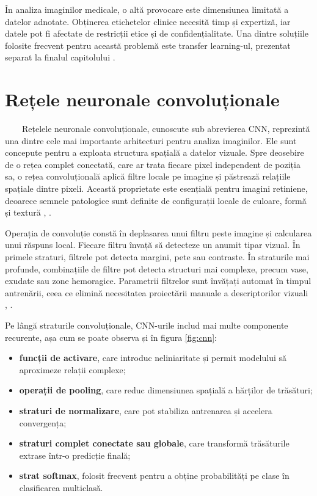 \documentclass[12pt, a4paper, twoside, romanian]{teza-upb}
\begin{document}
În analiza imaginilor medicale, o altă provocare este dimensiunea limitată a datelor
adnotate. Obținerea etichetelor clinice necesită timp și expertiză, iar datele pot fi
afectate de restricții etice și de confidențialitate. Una dintre soluțiile folosite frecvent
pentru această problemă este transfer learning-ul, prezentat separat la finalul capitolului
\cite{10_jabbar2022transfer}.

\section{Rețele neuronale convoluționale}

\ \ \ \ Rețelele neuronale convoluționale, cunoscute sub abrevierea CNN, reprezintă una dintre cele mai
importante arhitecturi pentru analiza imaginilor. Ele sunt concepute pentru a exploata structura
spațială a datelor vizuale. Spre deosebire de o rețea complet conectată, care
ar trata fiecare pixel independent de poziția sa, o rețea convoluțională aplică
filtre locale pe imagine și păstrează relațiile spațiale dintre pixeli. Această proprietate
este esențială pentru imagini retiniene, deoarece semnele patologice sunt definite de configurații
locale de culoare, formă și textură \cite{4_pratt2016convolutional}, \cite{9_chetoui2020explainable}.
\bigskip

Operația de convoluție constă în deplasarea unui filtru peste imagine și calcularea
unui răspuns local. Fiecare filtru învață să detecteze un anumit tipar vizual.
În primele straturi, filtrele pot detecta margini, pete sau contraste. În straturile
mai profunde, combinațiile de filtre pot detecta structuri mai complexe, precum vase,
exudate sau zone hemoragice. Parametrii filtrelor sunt învățați automat în timpul antrenării,
ceea ce elimină necesitatea proiectării manuale a descriptorilor vizuali
\cite{19_lecun2015deep}, \cite{4_pratt2016convolutional}.
\bigskip

Pe lângă straturile convoluționale, CNN-urile includ mai multe componente recurente, așa cum se poate observa 
și în figura \ref{fig:cnn}:

\begin{itemize}
  \item \textbf{funcții de activare}, care introduc neliniaritate și permit modelului să aproximeze relații complexe;
  \item \textbf{operații de pooling}, care reduc dimensiunea spațială a hărților de trăsături;
  \item \textbf{straturi de normalizare}, care pot stabiliza antrenarea și accelera convergența;
  \item \textbf{straturi complet conectate sau globale}, care transformă trăsăturile extrase într-o predicție finală;
  \item \textbf{strat softmax}, folosit frecvent pentru a obține probabilități pe clase în clasificarea multiclasă.
\end{itemize}
\bigskip
\end{document}
